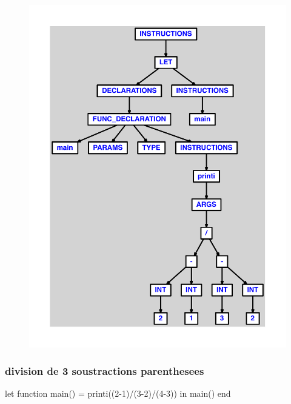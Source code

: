 \documentclass{article}
\begin{document}
\begin{figure}[H]\centering\includegraphics[max width=\textwidth]{ast/ast_105.pdf}\end{figure}\subsubsection{division de 3 soustractions parenthesees}
\begin{verbatimtab}
let function main() = printi((2-1)/(3-2)/(4-3)) in main() end
\end{verbatimtab}
\end{document}
